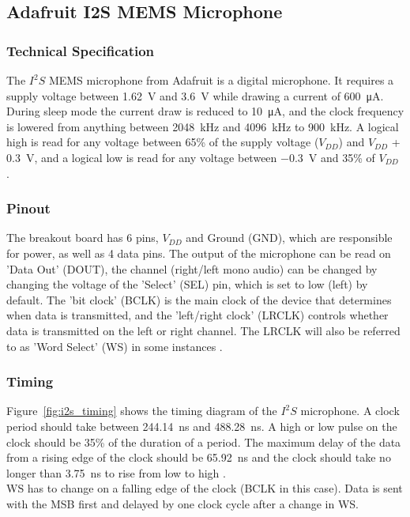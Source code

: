 \subsection{Adafruit I2S MEMS Microphone}

\subsubsection{Technical Specification}

The $I^2S$ MEMS microphone from Adafruit \cite{i2s_mic} is a digital microphone.
It requires a supply voltage between \SI{1.62}{\volt} and \SI{3.6}{\volt} while drawing a current of \SI{600}{\micro\ampere}.
During sleep mode the current draw is reduced to \SI{10}{\micro\ampere}, and the clock frequency is lowered from anything between
\SI{2048}{\kilo\hertz} and \SI{4096}{\kilo\hertz} to \SI{900}{\kilo\hertz}.
A logical high is read for any voltage between 65\% of the supply voltage ($V_{DD}$) and $V_{DD}$ + \SI{0.3}{\volt},
and a logical low is read for any voltage between \SI{-0.3}{\volt} and 35\% of $V_{DD}$ \cite{i2s_mic_datasheet}.

\subsubsection{Pinout}

The breakout board has 6 pins, $V_{DD}$ and Ground (GND), which are responsible for power, as well as 4 data pins.
The output of the microphone can be read on 'Data Out' (DOUT), the channel (right/left mono audio) can be changed by
changing the voltage of the 'Select' (SEL) pin, which is set to low (left) by default.
The 'bit clock' (BCLK) is the main clock of the device that determines when data is transmitted, and the 'left/right clock' (LRCLK)
controls whether data is transmitted on the left or right channel.
The LRCLK will also be referred to as 'Word Select' (WS) in some instances \cite{i2s_mic_pinout}.

\subsubsection{Timing}

Figure~\ref{fig:i2s_timing} shows the timing diagram of the $I^2S$ microphone.
A clock period should take between \SI{244.14}{\nano\second} and \SI{488.28}{\nano\second}.
A high or low pulse on the clock should be 35\% of the duration of a period.
The maximum delay of the data from a rising edge of the clock should be \SI{65.92}{\nano\second}
and the clock should take no longer than \SI{3.75}{\nano\second} to rise from low to high \cite{i2s_mic_datasheet}.
\\
WS has to change on a falling edge of the clock (BCLK in this case).
Data is sent with the MSB first and delayed by one clock cycle after a change in WS.


